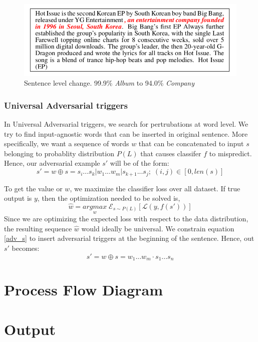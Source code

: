 \documentclass[12pt]{report}
\begin{document}
\begin{spacing}{1.5}
\begin{figure}[!h]
  \centering
  \includegraphics[width=0.8\linewidth]{./img/liang_sen.png}
  \caption{Sentence level change. 99.9\% \textit{Album} to 94.0\% \textit{Company} \cite{liang2018}}
  \label{liang_sen}
\end{figure}

\subsection{Universal Adversarial triggers}
In Universal Adversarial triggers, we search for pertrubations at word level.
We try to find input-agnostic words that can be inserted in original sentence.
More specifically, we want a sequence of words $w$ that can be concatenated to input $s$ belonging to probablity distribution $P(L)$ that causes classifer $f$ to mispredict.
Hence, our adversarial example $s'$ will be of the form:
\begin{equation}
  \label{adv_s}
  s' = w \oplus s = s_i...s_k | w_1...w_m | s_{k+1}...s_j; \; (i,j) \in [0, len(s)] 
\end{equation}

To get the value or $w$, we maximize the classifier loss over all dataset. If true output is $y$, then the optimization needed to be solved is,
\begin{equation}
  \label{eq: optim}
  \hat{w} = \underset{w}{argmax} \; \mathcal{E}_{s \sim P(L)}[\mathcal{L}(y, f(s'))]
\end{equation}
Since we are optimizing the expected loss with respect to the
data distribution, the resulting sequence $\hat{w}$ would ideally be
universal. We constrain equation \ref{adv_s} to insert adversarial triggers at the beginning of the sentence. Hence, out $s'$ becomes:
\begin{equation}
  \label{eq: trigger}
  s' = w \oplus s = w_1...w_m \cdot s_1...s_n
\end{equation}

\chapter{Process Flow Diagram}

\chapter{Output}
\cite{behjati2019}
\end{spacing}



\end{document}
